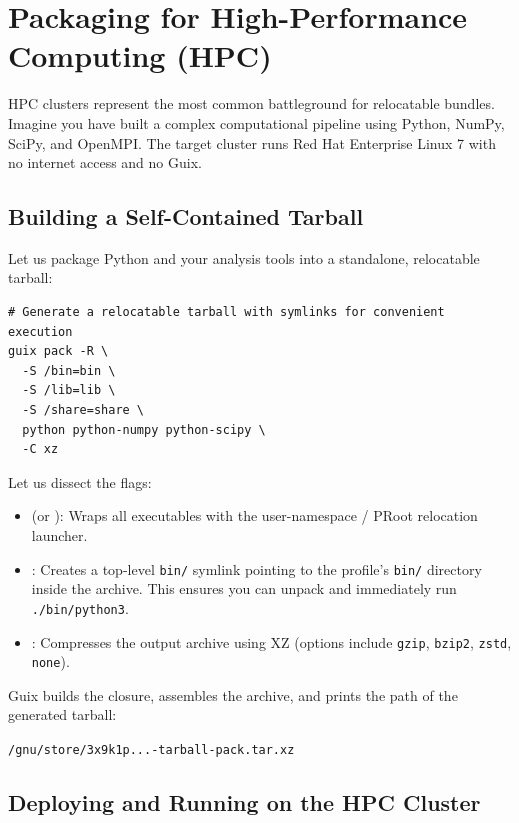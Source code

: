 \section{Packaging for High-Performance Computing (HPC)}

HPC clusters represent the most common battleground for relocatable bundles. Imagine you have built a complex computational pipeline using Python, NumPy, SciPy, and OpenMPI. The target cluster runs Red Hat Enterprise Linux 7 with no internet access and no Guix.

\subsection{Building a Self-Contained Tarball}

Let us package Python and your analysis tools into a standalone, relocatable tarball:

\begin{lstlisting}[style=guixcli]
# Generate a relocatable tarball with symlinks for convenient execution
guix pack -R \
  -S /bin=bin \
  -S /lib=lib \
  -S /share=share \
  python python-numpy python-scipy \
  -C xz
\end{lstlisting}

Let us dissect the flags:
\begin{itemize}
  \item {} (or ): Wraps all executables with the user-namespace / PRoot relocation launcher.
  \item {}: Creates a top-level \texttt{bin/} symlink pointing to the profile's \texttt{bin/} directory inside the archive. This ensures you can unpack and immediately run \texttt{./bin/python3}.
  \item {}: Compresses the output archive using XZ (options include \texttt{gzip}, \texttt{bzip2}, \texttt{zstd}, \texttt{none}).
\end{itemize}

Guix builds the closure, assembles the archive, and prints the path of the generated tarball:
\begin{center}
\texttt{/gnu/store/3x9k1p...-tarball-pack.tar.xz}
\end{center}

\subsection{Deploying and Running on the HPC Cluster}

